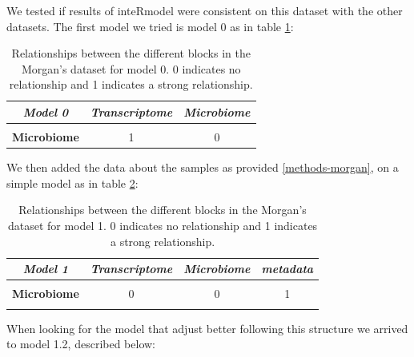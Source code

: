 \documentclass[
  12pt,
  a4paper,
  twoside,
  openright]{book}
\begin{document}
We tested if results of inteRmodel were consistent on this dataset with the other datasets.
The first model we tried is model 0 as in table \ref{tab:morgan-model0}:

\begin{table}[H]

\caption[Model 0 of the Morgan's dataset.]{\label{tab:morgan-model0}Relationships between the different blocks in the Morgan's dataset for model 0. 0 indicates no relationship and 1 indicates a strong relationship.}
\centering
\begin{tabular}[t]{|>{}c|c|>{}c|}
\hline
\em{\textbf{Model 0}} & \em{\textbf{Transcriptome}} & \em{\textbf{Microbiome}}\\
\hline
\textbf{\cellcolor{gray!6}{Transcriptome}} & \cellcolor{gray!6}{0} & \cellcolor{gray!6}{1}\\
\hline
\textbf{Microbiome} & 1 & 0\\
\hline
\end{tabular}
\end{table}

We then added the data about the samples as provided \ref{methods-morgan}, on a simple model as in table \ref{tab:morgan-model1}:

\begin{table}[H]

\caption[Model 1 of the Morgan's dataset.]{\label{tab:morgan-model1}Relationships between the different blocks in the Morgan's dataset for model 1. 0 indicates no relationship and 1 indicates a strong relationship.}
\centering
\begin{tabular}[t]{|>{}c|c|c|>{}c|}
\hline
\em{\textbf{Model 1}} & \em{\textbf{Transcriptome}} & \em{\textbf{Microbiome}} & \em{\textbf{metadata}}\\
\hline
\textbf{\cellcolor{gray!6}{Transcriptome}} & \cellcolor{gray!6}{0} & \cellcolor{gray!6}{0} & \cellcolor{gray!6}{1}\\
\hline
\textbf{Microbiome} & 0 & 0 & 1\\
\hline
\textbf{\cellcolor{gray!6}{metadata}} & \cellcolor{gray!6}{1} & \cellcolor{gray!6}{1} & \cellcolor{gray!6}{0}\\
\hline
\end{tabular}
\end{table}

When looking for the model that adjust better following this structure we arrived to model 1.2, described below:
\end{document}
